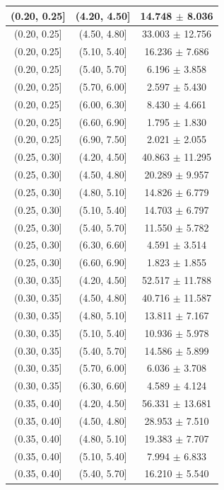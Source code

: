 \begin{longtable}{|c|c|c|}
(0.20, 0.25] & (4.20, 4.50] & 14.748 $\pm$ 8.036 \\ 
\hline
(0.20, 0.25] & (4.50, 4.80] & 33.003 $\pm$ 12.756 \\ 
\hline
(0.20, 0.25] & (5.10, 5.40] & 16.236 $\pm$ 7.686 \\ 
\hline
(0.20, 0.25] & (5.40, 5.70] & 6.196 $\pm$ 3.858 \\ 
\hline
(0.20, 0.25] & (5.70, 6.00] & 2.597 $\pm$ 5.430 \\ 
\hline
(0.20, 0.25] & (6.00, 6.30] & 8.430 $\pm$ 4.661 \\ 
\hline
(0.20, 0.25] & (6.60, 6.90] & 1.795 $\pm$ 1.830 \\ 
\hline
(0.20, 0.25] & (6.90, 7.50] & 2.021 $\pm$ 2.055 \\ 
\hline
(0.25, 0.30] & (4.20, 4.50] & 40.863 $\pm$ 11.295 \\ 
\hline
(0.25, 0.30] & (4.50, 4.80] & 20.289 $\pm$ 9.957 \\ 
\hline
(0.25, 0.30] & (4.80, 5.10] & 14.826 $\pm$ 6.779 \\ 
\hline
(0.25, 0.30] & (5.10, 5.40] & 14.703 $\pm$ 6.797 \\ 
\hline
(0.25, 0.30] & (5.40, 5.70] & 11.550 $\pm$ 5.782 \\ 
\hline
(0.25, 0.30] & (6.30, 6.60] & 4.591 $\pm$ 3.514 \\ 
\hline
(0.25, 0.30] & (6.60, 6.90] & 1.823 $\pm$ 1.855 \\ 
\hline
(0.30, 0.35] & (4.20, 4.50] & 52.517 $\pm$ 11.788 \\ 
\hline
(0.30, 0.35] & (4.50, 4.80] & 40.716 $\pm$ 11.587 \\ 
\hline
(0.30, 0.35] & (4.80, 5.10] & 13.811 $\pm$ 7.167 \\ 
\hline
(0.30, 0.35] & (5.10, 5.40] & 10.936 $\pm$ 5.978 \\ 
\hline
(0.30, 0.35] & (5.40, 5.70] & 14.586 $\pm$ 5.899 \\ 
\hline
(0.30, 0.35] & (5.70, 6.00] & 6.036 $\pm$ 3.708 \\ 
\hline
(0.30, 0.35] & (6.30, 6.60] & 4.589 $\pm$ 4.124 \\ 
\hline
(0.35, 0.40] & (4.20, 4.50] & 56.331 $\pm$ 13.681 \\ 
\hline
(0.35, 0.40] & (4.50, 4.80] & 28.953 $\pm$ 7.510 \\ 
\hline
(0.35, 0.40] & (4.80, 5.10] & 19.383 $\pm$ 7.707 \\ 
\hline
(0.35, 0.40] & (5.10, 5.40] & 7.994 $\pm$ 6.833 \\ 
\hline
(0.35, 0.40] & (5.40, 5.70] & 16.210 $\pm$ 5.540 \\ 

\end{longtable}
